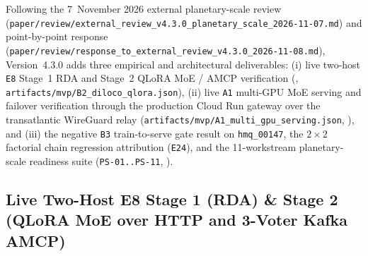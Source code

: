 \documentclass[11pt,a4paper]{article}
\begin{document}
Following the 7~November 2026 external planetary-scale review (\texttt{paper/review/external\_review\_v4.3.0\_planetary\_scale\_2026-11-07.md}) and point-by-point response (\texttt{paper/review/response\_to\_external\_review\_v4.3.0\_2026-11-08.md}), Version~4.3.0 adds three empirical and architectural deliverables: (i) live two-host \texttt{E8} Stage~1 RDA and Stage~2 QLoRA MoE / AMCP verification (, \texttt{artifacts/mvp/B2\_diloco\_qlora.json}), (ii) live \texttt{A1} multi-GPU MoE serving and failover verification through the production Cloud Run gateway over the transatlantic WireGuard relay (\texttt{artifacts/mvp/A1\_multi\_gpu\_serving.json}, ), and (iii) the negative \texttt{B3} train-to-serve gate result on \texttt{hmq\_00147}, the $2\times 2$ factorial chain regression attribution (\texttt{E24}), and the 11-workstream planetary-scale readiness suite (\texttt{PS-01..PS-11}, ).

\subsection{Live Two-Host E8 Stage 1 (RDA) \& Stage 2 (QLoRA MoE over HTTP and 3-Voter Kafka AMCP)}
\label{sec:v430_e8_two_host}
\end{document}
